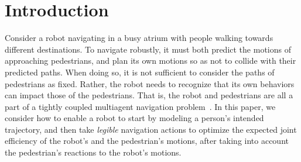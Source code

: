 \documentclass[conference]{IEEEtran}
\begin{document}

\section{Introduction}
\vspace{-0.3em}
\label{sec:intro}
\noindent

Consider a robot navigating in a busy atrium with people walking
towards different destinations. 
To navigate robustly, it must both predict the motions of approaching pedestrians, and plan its own motions so as not to collide with their predicted paths.
When doing so, it is not sufficient to consider the paths of pedestrians as 
fixed.  Rather, the robot needs to recognize that its own behaviors can 
impact those of the pedestrians. That is, the robot and pedestrians are all a 
part of a tightly coupled multiagent navigation 
problem~\cite{trautman2010unfreezing}.  In this paper, we consider how to 
enable a robot to start by modeling a person's intended trajectory, and then 
take \emph{legible} navigation actions to optimize the expected joint 
efficiency of the robot's and the pedestrian's motions, after taking into 
account the pedestrian's reactions to the robot's motions.

\end{document}
